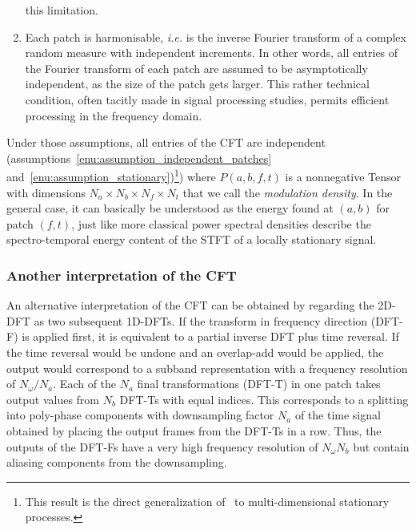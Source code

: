 \begin{enumerate}[leftmargin=0cm,itemindent=.5cm,labelwidth=\itemindent,labelsep=0cm,align=left]
this limitation.\label{enu:assumption_stationary}
\item Each patch is harmonisable, \emph{i.e.} is the inverse Fourier
transform of a complex random measure with independent increments.
In other words, all entries of the Fourier transform of each patch
are assumed to be asymptotically independent, as the size of the patch
gets larger. This rather technical condition, often tacitly made in
signal processing studies, permits efficient processing in the frequency
domain.\label{enu:assumption_harmonisable}
\end{enumerate}

Under those assumptions, all entries of the CFT are independent
(assumptions~\ref{enu:assumption_independent_patches} and~\ref{enu:assumption_stationary})\footnote{This result is the direct generalization
of~\cite[th. 6.5.1]{samoradnitsky94} to multi-dimensional stationary processes.}) 
where $P\left(a,b,f,t\right)$ is a nonnegative Tensor with dimensions $N_{a}\times N_{b}\times N_{f}\times N_{t}$
 that we call the \emph{modulation density}. In
the general case, it can basically be understood as the energy found at $\left(a,b\right)$ for patch
$\left(f,t\right)$, just like more classical power spectral
densities describe the spectro-temporal energy content of the STFT
of a locally stationary signal.

\subsubsection{Another interpretation of the CFT}

\label{sub:interpretation}

An alternative interpretation of the CFT can be obtained by regarding the 2D-DFT
as two subsequent 1D-DFTs. If the transform in frequency direction (DFT-F) is
applied first, it is equivalent to a partial inverse DFT plus time reversal. If
the time reversal would be undone and an overlap-add would be applied, the
output would correspond to a subband representation with a frequency resolution
of $N_\omega / N_a$. Each of the $N_a$ final transformations (DFT-T) in one
patch takes output values from $N_b$ DFT-Ts with equal indices. This corresponds
to a splitting into poly-phase components with downsampling factor $N_a$ of the
time signal obtained by placing the output frames from the DFT-Ts in a row.
Thus, the outputs of the DFT-Fs have a very high frequency resolution of
$N_\omega N_b$ but contain aliasing components from the downsampling.

